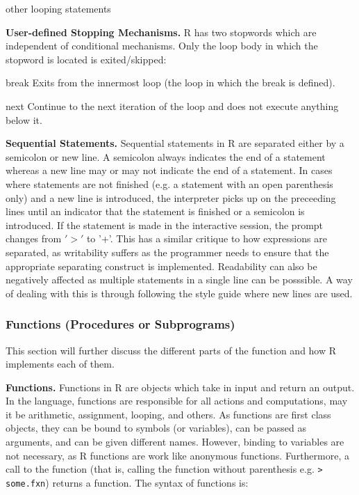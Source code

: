 \documentclass[12pt]{article}
\begin{document}
other looping statements

\textbf{User-defined Stopping Mechanisms.} R has two stopwords which are independent of conditional mechanisms. Only the loop body in which the stopword is located is exited/skipped:

\begin{description}
\item{break} Exits from the innermost loop (the loop in which the break is defined).
\item{next} Continue to the next iteration of the loop and does not execute anything below it.
\end{description}

\textbf{Sequential Statements.} Sequential statements in R are separated either by a semicolon or new line. A semicolon always indicates the end of a statement whereas a new line may or may not indicate the end of a statement. In cases where statements are not finished (e.g. a statement with an open parenthesis only) and a new line is introduced, the interpreter picks up on the preceeding lines until an indicator that the statement is finished or a semicolon is introduced. If the statement is made in the interactive session, the prompt changes from \('>'\) to '+'. This has a similar critique to how expressions are separated, as writability suffers as the programmer needs to ensure that the appropriate separating construct is implemented. Readability can also be negatively affected as multiple statements in a single line can be posssible. A way of dealing with this is through following the style guide where new lines are used.

\subsubsection{Functions (Procedures or Subprograms)}

This section will further discuss the different parts of the function and how R implements each of them.

\textbf{Functions.} Functions in R are objects which take in input and return an output. In the language, functions are responsible for all actions and computations, may it be arithmetic, assignment, looping, and others. As functions are first class objects, they can be bound to symbols (or variables), can be passed as arguments, and can be given different names. However, binding to variables are not necessary, as R functions are work like anonymous functions. Furthermore, a call to the function (that is, calling the function without parenthesis e.g. \texttt{> some.fxn}) returns a function.  The syntax of functions is:
\end{document}
